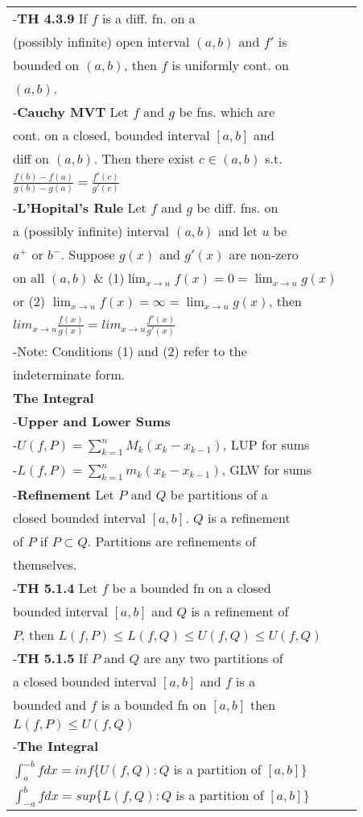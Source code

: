 \documentclass[10 pt,landscape]{article}
\begin{document}
\begin{multicols}{4}
\begin{tabular}{@{}ll@{}}
-\textbf{TH 4.3.9} If $f$ is a diff. fn. on a\\ (possibly infinite) open interval $(a,b)$ and $f'$ is \\ bounded on $(a,b)$, then $f$ is uniformly  cont. on\\ $(a,b)$.\\
-\textbf{Cauchy MVT} Let $f$ and $g$ be fns. which are \\cont. on a closed, bounded interval $[a,b]$ and\\ diff on $(a,b)$. Then there exist $c \in (a,b)$ s.t. \\ $\frac{f(b)-f(a)}{g(b)-g(a)}=\frac{f'(c)}{g'(c)}$\\
-\textbf{L'Hopital's Rule} Let $f$ and $g$ be diff. fns. on \\ a (possibly infinite) interval $(a,b)$ 
and let $u$ be \\
$a^{+}$ or $b^{-}$. Suppose $g(x)$ and $g'(x)$ are 
non-zero\\ on all $(a,b)$ \& (1)$ \lim_{x \to 
	u}f(x)=0=\lim_{x \to u}g(x)$ \\ or (2) $ \lim_{x \to u}f(x)=\infty=\lim_{x \to u}g(x)$, then\\ $lim_{x \to u}\frac{f(x)}{g(x)}=lim_{x \to u}\frac{f'(x)}{g'(x)}$\\
-Note: Conditions (1) and (2) refer to the\\ indeterminate form.
\\
\textbf{The Integral}\\
-\textbf{Upper and Lower Sums}\\
-$U(f,P)=\sum_{k=1}^{n}M_k(x_k-x_{k-1})$, LUP for sums\\
-$L(f,P)=\sum_{k=1}^{n}m_k(x_k-x_{k-1})$, GLW for sums\\
-\textbf{Refinement} Let $P$ and $Q$ be partitions of a \\closed bounded interval $[a,b]$. $Q$ is a refinement\\ of $P$ if $P \subset Q$. Partitions are refinements of\\ themselves.\\
-\textbf{TH 5.1.4} Let $f$ be a bounded fn on a closed\\ bounded interval $[a,b]$ and $Q$ is a refinement of \\$P$, then $L(f,P)\leq L(f,Q)\leq U(f,Q) \leq U(f,Q)$\\
-\textbf{TH 5.1.5} If $P$ and $Q$ are any two partitions of \\a closed bounded interval $[a,b]$ and $f$ is a \\bounded and $f$ is a bounded fn on $[a,b]$ then \\ $L(f,P)\leq U(f,Q)$\\
-\textbf{The Integral}\\
$\int_{a}^{-b}f dx=inf\{U(f,Q): Q$ is a partition of $[a,b]\}$\\
$\int_{-a}^{b}f dx=sup\{L(f,Q): Q$ is a partition of $[a,b]\}$\\
\end{tabular} 



\end{multicols}
\end{document}
